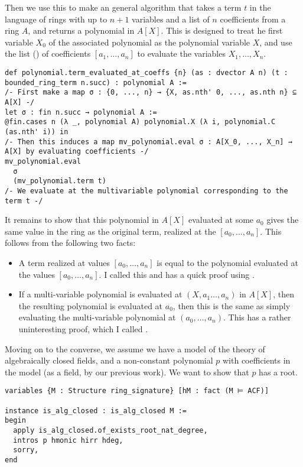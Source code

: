 Then we use this to make an general algorithm that takes
a term $t$ in the language of rings with up to $n + 1$ variables
and a list of $n$ coefficients from a ring $A$,
and returns a polynomial in $A[X]$.
This is designed to treat he first variable $X_{0}$ of the associated polynomial
as the polynomial variable $X$,
and use the list () of coefficients
$[a_{1},\dots,a_{n}]$ to evaluate the variables $X_{1},\dots,X_{n}$.

\begin{lstlisting}
def polynomial.term_evaluated_at_coeffs {n} (as : dvector A n) (t : bounded_ring_term n.succ) : polynomial A :=
/- First make a map σ : {0, ..., n} → {X, as.nth' 0, ..., as.nth n} ⊆ A[X] -/
let σ : fin n.succ → polynomial A :=
@fin.cases n (λ _, polynomial A) polynomial.X (λ i, polynomial.C (as.nth' i)) in
/- Then this induces a map mv_polynomial.eval σ : A[X_0, ..., X_n] → A[X] by evaluating coefficients -/
mv_polynomial.eval
  σ
  (mv_polynomial.term t)
/- We evaluate at the multivariable polynomial corresponding to the term t -/
\end{lstlisting}

It remains to show that this polynomial in $A[X]$
evaluated at some $a_{0}$ gives the same value in the ring as the original term,
realized at the  $[a_{0},\dots,a_{n}]$.
This follows from the following two facts:
\begin{itemize}
  \item A term  realized at values $[a_{0},\dots,a_{n}]$ is equal to
        the polynomial 
        evaluated at the values $[a_{0},\dots,a_{n}]$.
        I called this 
        and has a quick proof using .
  \item If a multi-variable polynomial is evaluated at $(X,a_{1}\dots,a_{n})$
        in $A[X]$, then the resulting polynomial is evaluated at $a_{0}$,
        then this is the same as simply evaluating the multi-variable polynomial
        at $(a_{0},\dots,a_{n})$.
        This has a rather uninteresting proof,
        which I called .
\end{itemize}

Moving on to the converse, we assume we have a model  of the theory
of algebraically closed fields, and a non-constant polynomial $p$
with coefficients in the model (as a field, by our previous work).
We want to show that $p$ has a root.
\begin{lstlisting}
variables {M : Structure ring_signature} [hM : fact (M ⊨ ACF)]

instance is_alg_closed : is_alg_closed M :=
begin
  apply is_alg_closed.of_exists_root_nat_degree,
  intros p hmonic hirr hdeg,
  sorry,
end\end{lstlisting}


